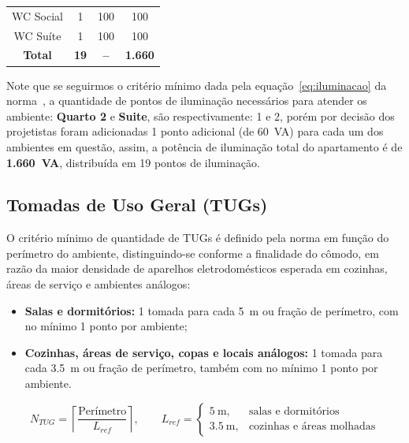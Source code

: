 \documentclass[12pt,openright,oneside,a4paper,brazil]{abntex2}
\begin{document}
\begin{table}[H]
\begin{tabular}{cccc}
WC Social                          & 1                                    & 100                        & 100                     \\
WC Suíte                           & 1                                    & 100                        & 100                     \\
\midrule \rowcolor[HTML]{ffc187}
\textbf{Total}                              & \textbf{19}                          & \textbf{--}                & \textbf{1.660}         \\
\bottomrule
\end{tabular}

\label{tab:iluminacao_apartamento_individual}
\end{table}

Note que se seguirmos o critério mínimo dada pela equação~\ref{eq:iluminacao} da norma~\cite{nbr5410}, a quantidade de pontos de iluminação necessários para atender os ambiente: \textbf{Quarto 2} e \textbf{Suite}, são respectivamente: 1 e 2, porém por decisão dos projetistas foram adicionadas 1 ponto adicional (de 60~VA) para cada um dos ambientes em questão, assim, a potência de iluminação total do apartamento é de \textbf{1.660~VA}, distribuída em 19 pontos de iluminação.

\subsection{Tomadas de Uso Geral (TUGs)}

\hspace{1.27cm} O critério mínimo de quantidade de TUGs é definido pela norma em função do
{perímetro} do ambiente, distinguindo-se conforme a finalidade do
cômodo, em razão da maior densidade de aparelhos eletrodomésticos esperada
em cozinhas, áreas de serviço e ambientes análogos:

\begin{itemize}[leftmargin=1.2cm]
    \item \textbf{Salas e dormitórios:} 1 tomada para cada \SI{5}{\meter} ou
    fração de perímetro, com no mínimo 1 ponto por ambiente;
    \item \textbf{Cozinhas, áreas de serviço, copas e locais análogos:} 1
    tomada para cada \SI{3,5}{\meter} ou fração de perímetro, também com no
    mínimo 1 ponto por ambiente.
\end{itemize}

\begin{equation}
    N_{TUG} = \left\lceil \dfrac{\text{Per\'imetro}}{L_{ref}} \right\rceil,
    \qquad
    L_{ref} =
    \begin{cases}
        \SI{5}{\meter}, & \text{salas e dormitórios} \\
        \SI{3,5}{\meter}, & \text{cozinhas e áreas molhadas}
    \end{cases}
    \label{eq:tug}
\end{equation}
\end{document}
